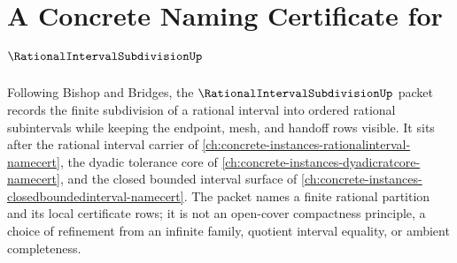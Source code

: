 \chapter{A Concrete Naming Certificate for $\RationalIntervalSubdivisionUp$}
\label{ch:concrete-instances-rational-interval-subdivision-namecert}

Following Bishop and Bridges, the $\RationalIntervalSubdivisionUp$ packet records the finite subdivision of a rational interval into ordered rational subintervals while keeping the endpoint, mesh, and handoff rows visible. It sits after the rational interval carrier of \autoref{ch:concrete-instances-rationalinterval-namecert}, the dyadic tolerance core of \autoref{ch:concrete-instances-dyadicratcore-namecert}, and the closed bounded interval surface of \autoref{ch:concrete-instances-closedboundedinterval-namecert}. The packet names a finite rational partition and its local certificate rows; it is not an open-cover compactness principle, a choice of refinement from an infinite family, quotient interval equality, or ambient completeness.


